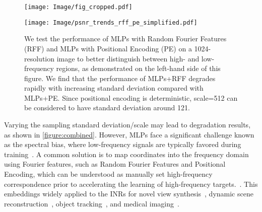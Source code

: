 \begin{figure*}[!ht]
    \centering
    \begin{minipage}[b]{0.25\textwidth}
        \centering
        \texttt{[image: Image/fig\_cropped.pdf]} %
        \label{figure:small_image}
        \vspace{-20pt}
    \end{minipage}%
    \hfill
    \begin{minipage}[b]{0.75\textwidth}
        \centering
        \texttt{[image: Image/psnr\_trends\_rff\_pe\_simplified.pdf]} %
        \vspace{-20pt}
        \label{figure:large_image}
        
    \end{minipage}
    \caption{We test the performance of MLPs with Random Fourier Features (RFF) and MLPs with Positional Encoding (PE) on a 1024-resolution image to better distinguish between high- and low-frequency regions, as demonstrated on the left-hand side of this figure. We find that the performance of MLPs+RFF degrades rapidly with increasing standard deviation compared with MLPs+PE. Since positional encoding is deterministic, scale=512 can be considered to have standard deviation around 121.}
    \label{figure:combined}
    \vspace{-10pt}
\end{figure*}
Varying the sampling standard deviation/scale may lead to degradation results, as shown in \autoref{figure:combined}.
%
However, MLPs face a significant challenge known as the spectral bias, where low-frequency signals are typically favored during training~\citep{rahaman2019spectral}. 
A common solution is to map coordinates into the frequency domain using Fourier features, such as Random Fourier Features and Positional Encoding, which can be understood as manually set high-frequency correspondence prior to accelerating the learning of high-frequency targets.~\citep{tancik2020fourier}. 
This embeddings widely applied to the INRs for novel view synthesis~\citep{mildenhall2021nerf,barron2021mip}, dynamic scene reconstruction~\citep{pumarola2021d}, object tracking~\citep{wang2023tracking}, and medical imaging~\citep{corona2022mednerf}.


